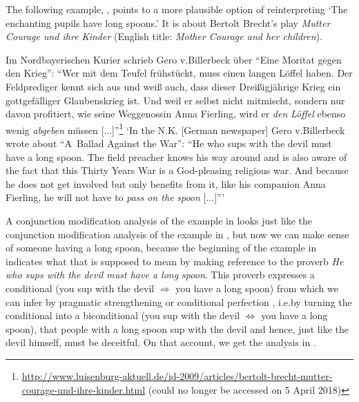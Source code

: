 \documentclass[output=paper]{langsci/langscibook}
\begin{document}
The following example, , points to a more plausible option of reinterpreting `The enchanting pupils have long spoons.' It is about Bertolt Brecht's play \textit{Mutter Courage und ihre Kinder} (English title: \textit{Mother Courage and her children}).

\ea \label{quoted long spoon}
Im Nordbayerischen Kurier schrieb Gero v.\@ Billerbeck über ``Eine Moritat gegen den Krieg'': ``Wer mit dem Teufel frühstückt, muss einen langen Löffel haben. Der Feldprediger kennt sich aus und weiß auch, dass dieser Dreißigjährige Krieg ein gottgefälliger Glaubenskrieg ist. Und weil er selbst nicht mitmischt, sondern nur davon profitiert, wie seine Wegge\-nos\-sin Anna Fierling, wird er \textit{den} \underline{} \textit{Löffel} ebenso wenig \textit{abgeben} müssen [...]''\footnote{\url{http://www.luisenburg-aktuell.de/id-2009/articles/bertolt-brecht-mutter-courage-und-ihre-kinder.html} (could no longer be accessed on 5 April 2018)}
\glt `In the N.K. [German newspaper] Gero v.\@ Billerbeck wrote about ``\mbox{A Ballad} Against the War'': ``He who sups with the devil must have a long spoon. The field preacher knows his way around and is also aware of the fact that this Thirty Years War is a God-pleasing religious war. And because he does not get involved but only benefits from it, like his companion Anna Fierling, he will not have to \textit{pass on the} \underline{} \textit{spoon} [...]'''
\z

\noindent A conjunction modification analysis of the example in  looks just like the conjunction modification analysis of the example in , but now we can make sense of someone having a long spoon, because the beginning of the example in  indicates what that is supposed to mean by making reference to the proverb \textit{He who sups with the devil must have a long spoon}. This proverb expresses a conditional (you sup with the devil $\Rightarrow$ you have a long spoon) from which we can infer by pragmatic strengthening or conditional perfection \citep[][]{geiszwicky71}, i.e.\@ by turning the conditional into a biconditional (you sup with the devil $\Leftrightarrow$ you have a long spoon), that people with a long spoon sup with the devil and hence, just like the devil himself, must be deceitful. On that account, we get the analysis in .\largerpage[-2]
\end{document}
